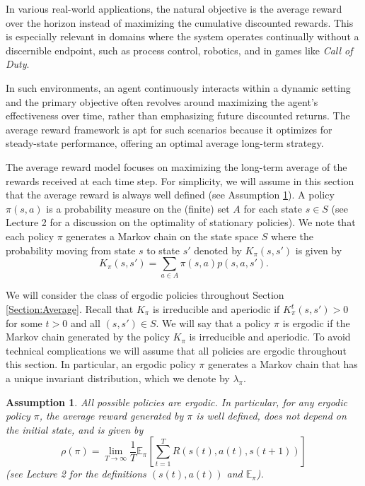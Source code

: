 \documentclass[letter,11pt]{article}
\newtheorem{assumption}{Assumption}[section]
\begin{document}
In various real-world applications, the natural objective is the average reward over the horizon instead of  maximizing the cumulative discounted rewards. This is especially relevant in domains where the system operates continually without a discernible endpoint, such as process control, robotics, and in games like \emph{Call of Duty}.

In such environments, an agent continuously interacts within a dynamic setting and the primary objective often revolves around maximizing the agent's effectiveness over time, rather than emphasizing future discounted returns. The average reward framework is apt for such scenarios because it optimizes for steady-state performance, offering an optimal average long-term strategy.


The average reward model focuses on maximizing the long-term average of the rewards received at each time step. For simplicity, we will assume in  this section that the average reward is always well defined (see Assumption \ref{Assumpt:AverageReward}). A policy $\pi(s,a)$ is a probability measure on the (finite) set $A$ for each state $s \in S$ (see Lecture 2 for a discussion on the optimality of stationary policies). We note that each policy $\pi$ generates a Markov chain on the state space $S$ where the probability moving from state $s$ to state $s'$ denoted by $K_{\pi} (s,s')$ is given by 
$$ K_{\pi}(s,s') = \sum _{a \in A} \pi(s,a) p(s,a,s').  $$

We will consider the class of ergodic policies  throughout Section \ref{Section:Average}. Recall that $K_{\pi}$ is irreducible and aperiodic if $K_{\pi}^{t}(s,s') > 0$ for some $t >0$ and all $(s,s') \in S$.  We will say that a policy $\pi$ is ergodic if the Markov chain generated by the policy $K_{\pi}$ is irreducible and aperiodic. To avoid technical complications we will assume that all policies are ergodic throughout this section. In particular, an ergodic policy  $\pi$ generates a Markov chain that has a unique invariant distribution, which we denote by $\lambda_{\pi}$. 

\begin{assumption} \label{Assumpt:AverageReward}
   All possible policies are ergodic. In particular, for any ergodic policy $\pi$, the average reward generated by $\pi$ is well defined, does not depend on the initial state, and is given by
\[
\rho(\pi) = \lim_{T \to \infty} \frac{1}{T} \mathbb{E}_{\pi} \left[\sum_{t=1}^T R(s(t), a(t),s(t+1)) \right]
\]
(see Lecture 2 for the definitions  $(s(t),a(t))$ and $\mathbb{E}_{\pi} $).  
\end{assumption} 
\end{document}
